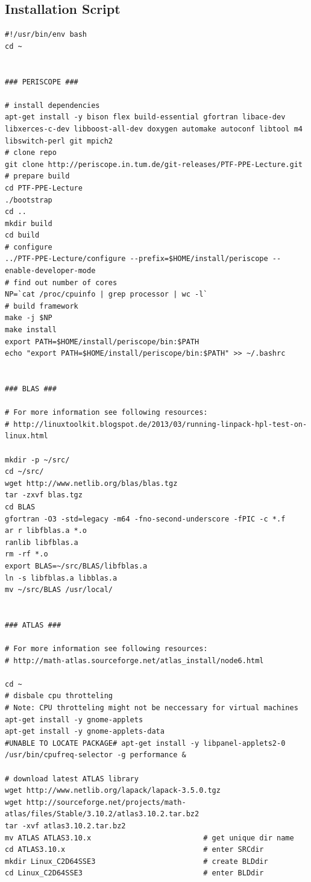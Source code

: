 \documentclass[10pt,twocolumn]{article}
\begin{document}
\begin{appendices}
\onecolumn
\section{Installation Script}
\label{sec:appendix_installationScript}

\begin{lstlisting}
#!/usr/bin/env bash
cd ~


### PERISCOPE ###

# install dependencies
apt-get install -y bison flex build-essential gfortran libace-dev libxerces-c-dev libboost-all-dev doxygen automake autoconf libtool m4 libswitch-perl git mpich2
# clone repo
git clone http://periscope.in.tum.de/git-releases/PTF-PPE-Lecture.git
# prepare build
cd PTF-PPE-Lecture
./bootstrap
cd .. 
mkdir build 
cd build
# configure
../PTF-PPE-Lecture/configure --prefix=$HOME/install/periscope --enable-developer-mode 
# find out number of cores
NP=`cat /proc/cpuinfo | grep processor | wc -l`
# build framework
make -j $NP
make install
export PATH=$HOME/install/periscope/bin:$PATH
echo "export PATH=$HOME/install/periscope/bin:$PATH" >> ~/.bashrc


### BLAS ###

# For more information see following resources:
# http://linuxtoolkit.blogspot.de/2013/03/running-linpack-hpl-test-on-linux.html 

mkdir -p ~/src/
cd ~/src/
wget http://www.netlib.org/blas/blas.tgz
tar -zxvf blas.tgz
cd BLAS
gfortran -O3 -std=legacy -m64 -fno-second-underscore -fPIC -c *.f
ar r libfblas.a *.o
ranlib libfblas.a
rm -rf *.o
export BLAS=~/src/BLAS/libfblas.a
ln -s libfblas.a libblas.a
mv ~/src/BLAS /usr/local/


### ATLAS ###

# For more information see following resources:
# http://math-atlas.sourceforge.net/atlas_install/node6.html

cd ~
# disbale cpu throtteling
# Note: CPU throtteling might not be neccessary for virtual machines
apt-get install -y gnome-applets
apt-get install -y gnome-applets-data
#UNABLE TO LOCATE PACKAGE# apt-get install -y libpanel-applets2-0
/usr/bin/cpufreq-selector -g performance &

# download latest ATLAS library
wget http://www.netlib.org/lapack/lapack-3.5.0.tgz
wget http://sourceforge.net/projects/math-atlas/files/Stable/3.10.2/atlas3.10.2.tar.bz2
tar -xvf atlas3.10.2.tar.bz2
mv ATLAS ATLAS3.10.x                          # get unique dir name
cd ATLAS3.10.x                                # enter SRCdir
mkdir Linux_C2D64SSE3                         # create BLDdir
cd Linux_C2D64SSE3                            # enter BLDdir


\end{lstlisting}
\end{appendices}
\end{document}
